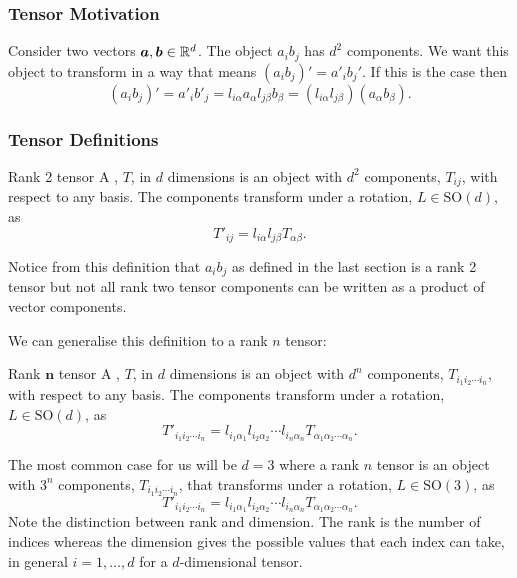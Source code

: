 \documentclass[a4paper]{article}
\newcommand{\specialOrthogonalGroup}{\mathrm{SO}}
\begin{document}
    \subsubsection{Tensor Motivation}
    Consider two vectors \(\bm{a}, \bm{b}\in\mathbb{R}^d\).
    The object \(a_ib_j\) has \(d^2\) components.
    We want this object to transform in a way that means \((a_ib_j)' = a'_ib_j'\).
    If this is the case then
    \[(a_ib_j)' = a'_ib'_j = l_{i\alpha}a_\alpha l_{j\beta}b_{\beta} = (l_{i\alpha}l_{j\beta})(a_\alpha b_\beta).\]
    
    \subsubsection{Tensor Definitions}
    \begin{definition}{Rank 2 tensor}{}
        A , \(T\), in \(d\) dimensions is an object with \(d^2\) components, \(T_{ij}\), with respect to any basis.
        The components transform under a rotation, \(L\in\specialOrthogonalGroup(d)\), as
        \[T'_{ij} = l_{i\alpha}l_{j\beta}T_{\alpha\beta}.\]
    \end{definition}
    Notice from this definition that \(a_ib_j\) as defined in the last section is a rank 2 tensor but not all rank two tensor components can be written as a product of vector components.
    
    We can generalise this definition to a rank \(n\) tensor:
    \begin{definition}{Rank \(\bm{n}\) tensor}{}
        A , \(T\), in \(d\) dimensions is an object with \(d^n\) components, \(T_{i_1i_2\dotsm i_n}\), with respect to any basis.
        The components transform under a rotation, \(L\in\specialOrthogonalGroup(d)\), as
        \[T'_{i_1i_2\dotsm i_n} = l_{i_1\alpha_1}l_{i_2\alpha_2}\dotsm l_{i_n\alpha_n}T_{\alpha_1\alpha_2\dotsm\alpha_n}.\]
    \end{definition}
    The most common case for us will be \(d = 3\) where a rank \(n\) tensor is an object with \(3^n\) components, \(T_{i_1i_2\dotsm i_n}\), that transforms under a rotation, \(L\in\specialOrthogonalGroup(3)\), as
    \[T'_{i_1i_2\dotsm i_n} = l_{i_1\alpha_1}l_{i_2\alpha_2}\dotsm l_{i_n\alpha_n}T_{\alpha_1\alpha_2\dotsm\alpha_n}.\]
    Note the distinction between rank and dimension.
    The rank is the number of indices whereas the dimension gives the possible values that each index can take, in general \(i = 1, \dotsc, d\) for a \(d\)-dimensional tensor.
    
\end{document}
